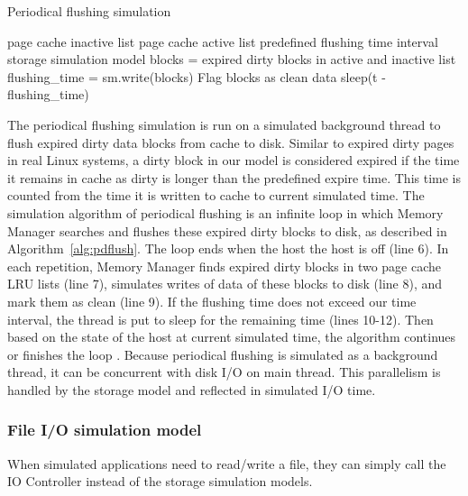 \documentclass[conference]{IEEEtran}
\newcommand{\Desc}[2]{\State \makebox[2em][l]{#1}#2}
\begin{document}
			\begin{algorithm}\caption{Periodical flushing simulation}\label{alg:pdflush}
				\small
				\begin{algorithmic}[1]
					\Input
        				\Desc{in}{page cache inactive list}
        				\Desc{ac}{page cache active list}
						\Desc{t}{predefined flushing time interval}
						\Desc{sm}{storage simulation model}
   					\EndInput
						\State blocks = expired dirty blocks in active and inactive list
						\State flushing\_time = sm.write(blocks)
						\State Flag blocks as clean data
							\State sleep(t - flushing\_time)
						\EndIf
					\EndWhile
				\end{algorithmic}
			\end{algorithm}				
			
			The periodical flushing simulation is run on a simulated background thread 
			to flush expired dirty data blocks from cache to disk.
			Similar to expired dirty pages in real Linux systems, a dirty block in our model 
			is considered expired if the time it remains in cache as dirty is longer than 
			the predefined expire time. This time is counted from the time it is written 
			to cache to current simulated time. 
			The simulation algorithm of periodical flushing is an infinite loop in which 
			Memory Manager searches and flushes these expired dirty blocks to disk, 
			as described in Algorithm~\ref{alg:pdflush}. 
			The loop ends when the host the host is off (line 6). 
			In each repetition, Memory Manager finds expired dirty blocks in two 
			page cache LRU lists (line 7), simulates writes of data of these blocks 
			to disk (line 8), and mark them as clean (line 9).
			If the flushing time does not exceed our time interval, the thread is put 
			to sleep for the remaining time (lines 10-12). 
			Then based on the state of the host at current simulated time, 
			the algorithm continues or finishes the loop .
			Because periodical flushing is simulated as a background thread, it can be 
			concurrent with disk I/O on main thread. This parallelism is handled by the 
			storage model and reflected in simulated I/O time. 	

			\subsubsection{File I/O simulation model}			
			 
			When simulated applications need to read/write a file, they can simply call 
			the IO Controller instead of the storage simulation models. 
			
\end{document}
